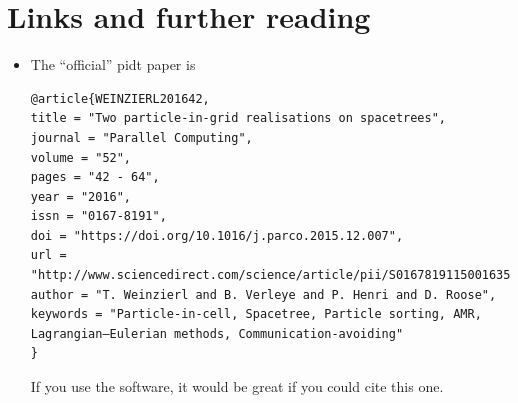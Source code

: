 \section*{Links and further reading}

\begin{itemize}
  \item The ``official'' pidt paper is
{\tiny \begin{verbatim}
@article{WEINZIERL201642,
title = "Two particle-in-grid realisations on spacetrees",
journal = "Parallel Computing",
volume = "52",
pages = "42 - 64",
year = "2016",
issn = "0167-8191",
doi = "https://doi.org/10.1016/j.parco.2015.12.007",
url = "http://www.sciencedirect.com/science/article/pii/S0167819115001635",
author = "T. Weinzierl and B. Verleye and P. Henri and D. Roose",
keywords = "Particle-in-cell, Spacetree, Particle sorting, AMR, Lagrangian–Eulerian methods, Communication-avoiding"
}  \end{verbatim}}
  If you use the software, it would be great if you could cite this one.
\end{itemize}


